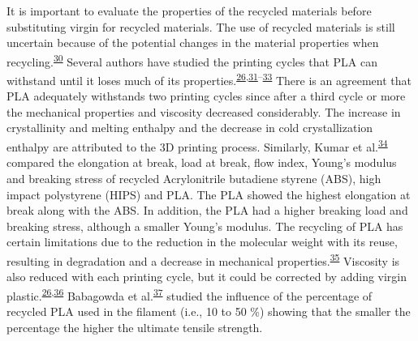 \documentclass[
  12pt]{article}
\begin{document}
It is important to evaluate the properties of the recycled materials before substituting virgin for recycled materials. The use of recycled materials is still uncertain because of the potential changes in the material properties when recycling.\textsuperscript{\protect\hyperlink{ref-Suarez2020}{30}}
Several authors have studied the printing cycles that PLA can withstand until it loses much of its properties.\textsuperscript{\protect\hyperlink{ref-Zhao2018}{26},\protect\hyperlink{ref-CruzSanchez2017}{31}--\protect\hyperlink{ref-Anderson2017}{33}}
There is an agreement that PLA adequately withstands two printing cycles since after a third cycle or more the mechanical properties and viscosity decreased considerably. The increase in crystallinity and melting enthalpy and the decrease in cold crystallization enthalpy are attributed to the 3D printing process.
Similarly, Kumar et al.\textsuperscript{\protect\hyperlink{ref-Kumar2018b}{34}} compared the elongation at break, load at break, flow index, Young's modulus and breaking stress of recycled Acrylonitrile butadiene styrene (ABS), high impact polystyrene (HIPS) and PLA.
The PLA showed the highest elongation at break along with the ABS. In addition, the PLA had a higher breaking load and breaking stress, although a smaller Young's modulus. The recycling of PLA has certain limitations due to the reduction in the molecular weight with its reuse, resulting in degradation and a decrease in mechanical properties.\textsuperscript{\protect\hyperlink{ref-Pinho2020}{35}}
Viscosity is also reduced with each printing cycle, but it could be corrected by adding virgin plastic.\textsuperscript{\protect\hyperlink{ref-Zhao2018}{26},\protect\hyperlink{ref-Zhao2018a}{36}}
Babagowda et al.\textsuperscript{\protect\hyperlink{ref-Babagowda2018}{37}} studied the influence of the percentage of recycled PLA used in the filament (i.e., 10 to 50 \%) showing that the smaller the percentage the higher the ultimate tensile strength.\\
\end{document}
